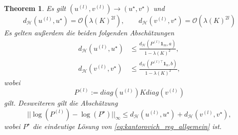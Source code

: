 \documentclass[11pt,a4paper]{article}
\newtheorem{theorem}{Theorem}[subsection]
\numberwithin{equation}{section}
\begin{document}
	\begin{theorem}
		Es gilt $(u^{(l)}, v^{(l)})\to (u^\star, v^\star)$ und
		\begin{equation}
		d_{\mathcal{H}}(u^{(l)}, u^\star) = \mathcal{O}(\lambda(K)^{2l}), \qquad d_\mathcal{H}(v^{(l)},v^\star) = \mathcal{O}(\lambda (K)^{2l}) \label{eq:erstesResThm42}
		\end{equation}
		Es gelten außerdem die beiden folgenden Abschätzungen
		\begin{align}
		d_\mathcal{H} (u^{(l)}, u^\star) &\leq \frac{d_\mathcal{H}(P^{(l)}\boldsymbol{1}_m, a)}{1-\lambda(K)^2}, \label{eq:thm42zweiAbschätzungen1}\\
		d_\mathcal{H} (v^{(l)}, v^\star) &\leq \frac{d_\mathcal{H}(P^{(l)\top}\boldsymbol{1}_n, b)}{1-\lambda(K)^2}, \label{eq:thm42zweiAbschätzungen}		
		\end{align}
		wobei \begin{equation}
		P^{(l)} := diag(u^{(l)})K diag(v^{(l)}) \label{eq:reconstruction_TransportPlan}
		\end{equation}
		gilt. Desweiteren gilt die Abschätzung
		\begin{equation}
		|| \log(P^{(l)}) - \log (P^\star)||_\infty \leq d_\mathcal{H} (u^{(l)}, u^\star) + d_\mathcal{H} (v^{(l)}, v^\star), \label{eq:thm42letzteAbschätzung}
		\end{equation}
		wobei $P^\star$ die eindeutige Lösung von \autoref{eq:kantorovich_reg_allgemein} ist.
	\end{theorem}
\end{document}
